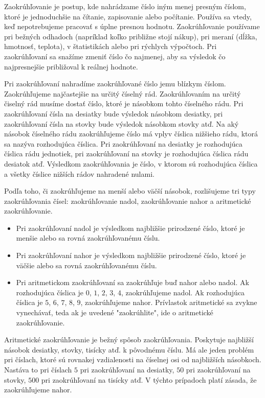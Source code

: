 \documentclass{article}
\begin{document}
Zaokrúhľovanie je postup, kde nahrádzame číslo iným menej presným číslom, ktoré je jednoduchšie na čítanie, zapisovanie alebo počítanie. Používa sa vtedy, keď nepotrebujeme pracovať s úplne presnou hodnotu. Zaokrúhľovanie používame pri bežných odhadoch (napríklad koľko približne stojí nákup), pri meraní (dĺžka, hmotnosť, teplota), v štatistikách alebo pri rýchlych výpočtoch. Pri zaokrúhľovaní sa snažíme zmeniť číslo čo najmenej, aby sa výsledok čo najpresnejšie približoval k reálnej hodnote.

Pri zaokrúhľovaní nahradíme zaokrúhľované číslo jemu blízkym číslom. Zaokrúhľujeme najčastejšie na určitý číselný rád. Zaokrúhľovaním na určitý čiselný rád musíme dostať číslo, ktoré je násobkom tohto číselného rádu. Pri zaokrúhľovaní čísla na desiatky bude výsledok násobkom desiatky, pri zaokrúhľovaní čísla na stovky bude výsledok násobkom stovky atď. Na aký násobok číselného rádu zaokrúhľujeme číslo má vplyv číslica nižšieho rádu, ktorá sa nazýva rozhodujúca číslica. Pri zaokrúhľovaní na desiatky je rozhodujúca číslica rádu jednotiek, pri zaokrúhľovaní na stovky je rozhodujúca číslica rádu desiatok atď. Výsledkom zaokrúhľovania je číslo, v ktorom sú rozhodujúca číslica a všetky číslice nižších rádov nahradené nulami.

Podľa toho, či zaokrúhľujeme na menší alebo väčší násobok, rozlišujeme tri typy zaokrúhľovania čísel: zaokrúhľovanie nadol, zaokrúhľovanie nahor a aritmetické zaokrúhľovanie.
\begin{itemize}
  \item Pri zaokrúhľovaní nadol je výsledkom najbližšie prirodzené číslo, ktoré je menšie alebo sa rovná zaokrúhľovanému číslu.
  \item Pri zaokrúhľovaní nahor je výsledkom najbližšie prirodzené číslo, ktoré je väčšie alebo sa rovná zaokrúhľovanému číslu.
  \item Pri aritmetickom zaokrúhľovaní sa zaokrúhľuje buď nahor alebo nadol. Ak rozhodujúca číslica je \(0\), \(1\), \(2\), \(3\), \(4\), zaokrúhľujeme nadol. Ak rozhodujúca číslica je \(5\), \(6\), \(7\), \(8\), \(9\), zaokrúhľujeme nahor. Prívlastok aritmetické sa zvykne vynechávať, teda ak je uvedené "zaokrúhlite", ide o aritmetické zaokrúhľovanie.
\end{itemize}
Aritmetické zaokrúhľovanie je bežný spôsob zaokrúhľovania. Poskytuje najbližší násobok desiatky, stovky, tisícky atď. k pôvodnému číslu. Má ale jeden problém pri číslach, ktoré sú rovnakej vzdialenosti na číselnej osi od najbližších násobkoch. Nastáva to pri číslach \(5\) pri zaokrúhľovaní na desiatky, \(50\) pri zaokrúhľovaní na stovky, \(500\) pri zaokrúhľovaní na tisícky atď. V týchto prípadoch platí zásada, že zaokrúhľujeme nahor.
\end{document}
